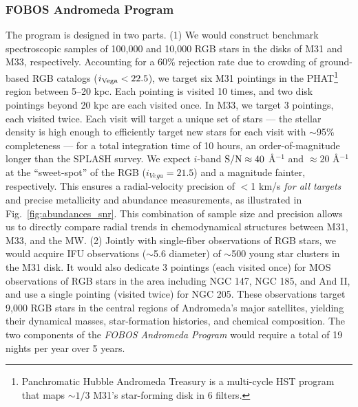 \documentclass[11pt,a4paper,twoside,onecolumn,openany,final,oldfontcommands]{memoir}
\begin{document}
\subsubsection{FOBOS Andromeda Program} The program is designed in two parts. (1) We would construct benchmark spectroscopic samples of 100,000 and 10,000 RGB stars in the disks of M31 and M33, respectively.  Accounting for a 60\% rejection rate \citep{dorman12} due to crowding of ground-based RGB catalogs ($i_{\rm Vega} < 22.5$), we target six M31 pointings in the PHAT\footnote{Panchromatic Hubble Andromeda Treasury \citep{phat} is a multi-cycle HST program that maps $\sim1/3$ M31's star-forming disk in 6 filters.} region between 5--20 kpc.  Each pointing is visited 10 times, and two disk pointings beyond 20 kpc are each visited once.  In M33, we target 3 pointings, each visited twice.  Each visit will target a unique set of stars --- the stellar density is high enough to efficiently target new stars for each visit with $\sim$95\% completeness --- for a total integration time of 10 hours, an order-of-magnitude longer than the SPLASH survey.  We expect $i$-band ${\rm S/N} \approx 40$ \AA$^{-1}$ and $\approx 20$ \AA$^{-1}$ at the  ``sweet-spot'' of the RGB ($i_{Vega} = 21.5$) and a magnitude fainter, respectively.  This ensures a radial-velocity precision of $<$1 km/s \textit{for all targets} and precise metallicity and abundance measurements, as illustrated in Fig.~\ref{fig:abundances_snr}.
This combination of sample size and precision allows us to directly compare radial trends in chemodynamical structures between M31, M33, and the MW. (2) Jointly with single-fiber observations of RGB stars, we would acquire IFU observations ($\sim$5.6\arcsec{} diameter) of $\sim$500 young star clusters in the M31 disk.  It would also dedicate 3 pointings (each visited once) for MOS observations of RGB stars in the area including NGC 147, NGC 185, and And II, and use a single pointing (visited twice) for NGC 205.  These observations target 9,000 RGB stars in the central regions of Andromeda's major satellites, yielding their dynamical masses, star-formation histories, and chemical composition.  The two components of the \textit{FOBOS Andromeda Program} would require a total of 19 nights per year over 5 years. 
\end{document}
